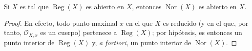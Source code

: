 \begin{corollary}[6.13.5]
\label{IV.2.s6.13.5-fr}
Si $X$ es tal que $\operatorname{Reg}(X)$ es abierto en $X$, entonces
$\operatorname{Nor}(X)$ es abierto en $X$.
\end{corollary}

\begin{proof}
En efecto, todo punto maximal $x$ en el que $X$ es reducido (y en el
que, por tanto, $\mathcal O_{X,x}$ es un cuerpo) pertenece a
$\operatorname{Reg}(X)$; por hipótesis, es entonces un punto interior
de $\operatorname{Reg}(X)$ y, \emph{a fortiori}, un punto interior de
$\operatorname{Nor}(X)$.
\end{proof}
